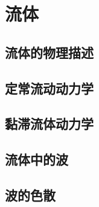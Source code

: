 \chapter{流体}


\section{流体的物理描述}

\section{定常流动动力学}

\section{黏滞流体动力学}

\section{流体中的波}

\section{波的色散}